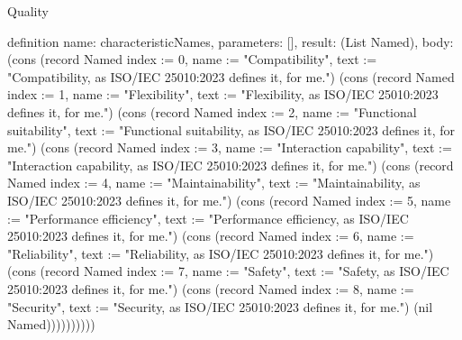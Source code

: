\begin{lexlean}{Quality}
\begin{semanticmodule}
definition{
  name: characteristicNames,
  parameters: [],
  result: (List Named),
  body: (cons (record Named {index := 0, name := "Compatibility", text := "Compatibility, as ISO/IEC 25010:2023 defines it, for me."}) (cons (record Named {index := 1, name := "Flexibility", text := "Flexibility, as ISO/IEC 25010:2023 defines it, for me."}) (cons (record Named {index := 2, name := "Functional suitability", text := "Functional suitability, as ISO/IEC 25010:2023 defines it, for me."}) (cons (record Named {index := 3, name := "Interaction capability", text := "Interaction capability, as ISO/IEC 25010:2023 defines it, for me."}) (cons (record Named {index := 4, name := "Maintainability", text := "Maintainability, as ISO/IEC 25010:2023 defines it, for me."}) (cons (record Named {index := 5, name := "Performance efficiency", text := "Performance efficiency, as ISO/IEC 25010:2023 defines it, for me."}) (cons (record Named {index := 6, name := "Reliability", text := "Reliability, as ISO/IEC 25010:2023 defines it, for me."}) (cons (record Named {index := 7, name := "Safety", text := "Safety, as ISO/IEC 25010:2023 defines it, for me."}) (cons (record Named {index := 8, name := "Security", text := "Security, as ISO/IEC 25010:2023 defines it, for me."}) (nil Named))))))))))
}


\end{semanticmodule}
\end{lexlean}
